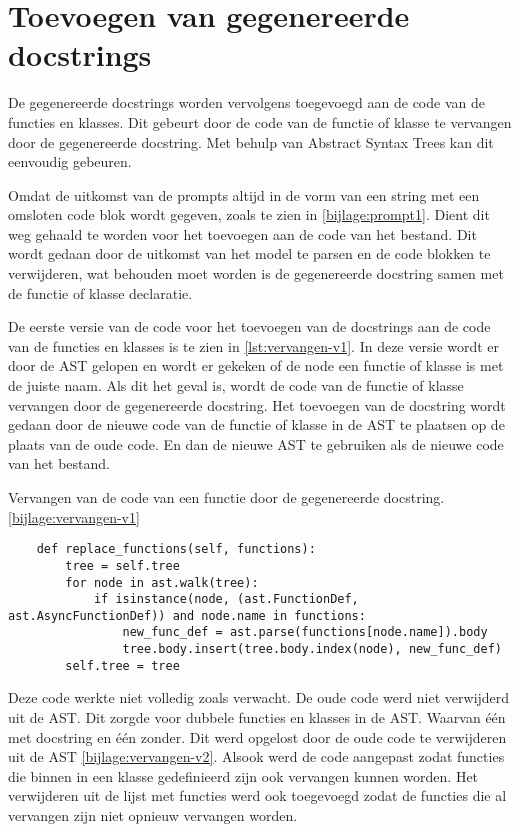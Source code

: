 \section{Toevoegen van gegenereerde docstrings}
\label{sec:bestanddocumentatie-vervangen}
De gegenereerde docstrings worden vervolgens toegevoegd aan de code van de functies en klasses.
Dit gebeurt door de code van de functie of klasse te vervangen door de gegenereerde docstring.
Met behulp van Abstract Syntax Trees kan dit eenvoudig gebeuren.

Omdat de uitkomst van de prompts altijd in de vorm van een string met een omsloten code blok wordt gegeven, zoals te zien in \ref{bijlage:prompt1}.
Dient dit weg gehaald te worden voor het toevoegen aan de code van het bestand. 
Dit wordt gedaan door de uitkomst van het model te parsen en de code blokken te verwijderen, wat behouden moet worden is de gegenereerde docstring samen met de functie of klasse declaratie.

De eerste versie van de code voor het toevoegen van de docstrings aan de code van de functies en klasses is te zien in \ref{lst:vervangen-v1}.
In deze versie wordt er door de AST gelopen en wordt er gekeken of de node een functie of klasse is met de juiste naam. 
Als dit het geval is, wordt de code van de functie of klasse vervangen door de gegenereerde docstring.
Het toevoegen van de docstring wordt gedaan door de nieuwe code van de functie of klasse in de AST te plaatsen op de plaats van de oude code.
En dan de nieuwe AST te gebruiken als de nieuwe code van het bestand.

\begin{listing}
    \caption{Vervangen van de code van een functie door de gegenereerde docstring. \ref{bijlage:vervangen-v1}}
    \label{lst:vervangen-v1}
    \begin{verbatim}
    def replace_functions(self, functions):
        tree = self.tree
        for node in ast.walk(tree):
            if isinstance(node, (ast.FunctionDef, ast.AsyncFunctionDef)) and node.name in functions:
                new_func_def = ast.parse(functions[node.name]).body
                tree.body.insert(tree.body.index(node), new_func_def)        
        self.tree = tree

    \end{verbatim}
\end{listing}

Deze code werkte niet volledig zoals verwacht. De oude code werd niet verwijderd uit de AST. Dit zorgde voor dubbele functies en klasses in de AST.
Waarvan één met docstring en één zonder. Dit werd opgelost door de oude code te verwijderen uit de AST \ref{bijlage:vervangen-v2}.
Alsook werd de code aangepast zodat functies die binnen in een klasse gedefinieerd zijn ook vervangen kunnen worden.
Het verwijderen uit de lijst met functies werd ook toegevoegd zodat de functies die al vervangen zijn niet opnieuw vervangen worden.

